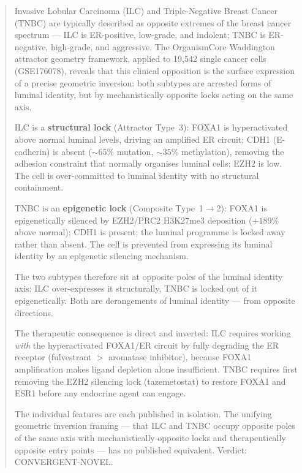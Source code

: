 \documentclass[12pt, a4paper]{article}
\begin{document}
\vspace{0.8em}

\begin{abstract}
\noindent
Invasive Lobular Carcinoma (ILC) and Triple-Negative
Breast Cancer (TNBC) are typically described as
opposite extremes of the breast cancer spectrum ---
ILC is ER-positive, low-grade, and indolent; TNBC
is ER-negative, high-grade, and aggressive. The
OrganismCore Waddington attractor geometry framework,
applied to 19,542 single cancer cells (GSE176078),
reveals that this clinical opposition is the surface
expression of a precise geometric inversion: both
subtypes are arrested forms of luminal identity, but
by mechanistically opposite locks acting on the same
axis.

ILC is a \textbf{structural lock} (Attractor Type~3):
FOXA1 is hyperactivated above normal luminal levels,
driving an amplified ER circuit; CDH1 (E-cadherin)
is absent (${\sim}65\%$ mutation, ${\sim}35\%$
methylation), removing the adhesion constraint that
normally organises luminal cells; EZH2 is low.
The cell is over-committed to luminal identity
with no structural containment.

TNBC is an \textbf{epigenetic lock}
(Composite Type~1$\rightarrow$2): FOXA1 is
epigenetically silenced by EZH2/PRC2 H3K27me3
deposition ($+189\%$ above normal); CDH1 is
present; the luminal programme is locked away
rather than absent. The cell is prevented from
expressing its luminal identity by an epigenetic
silencing mechanism.

The two subtypes therefore sit at opposite poles
of the luminal identity axis: ILC over-expresses
it structurally, TNBC is locked out of it
epigenetically. Both are derangements of luminal
identity --- from opposite directions.

The therapeutic consequence is direct and inverted:
ILC requires working \textit{with} the hyperactivated
FOXA1/ER circuit by fully degrading the ER receptor
(fulvestrant $>$ aromatase inhibitor), because
FOXA1 amplification makes ligand depletion alone
insufficient. TNBC requires first removing the
EZH2 silencing lock (tazemetostat) to restore FOXA1
and ESR1 before any endocrine agent can engage.

The individual features are each published in
isolation. The unifying geometric inversion framing
--- that ILC and TNBC occupy opposite poles of the
same axis with mechanistically opposite locks and
therapeutically opposite entry points --- has no
published equivalent. Verdict: CONVERGENT-NOVEL.
\end{abstract}
\end{document}
